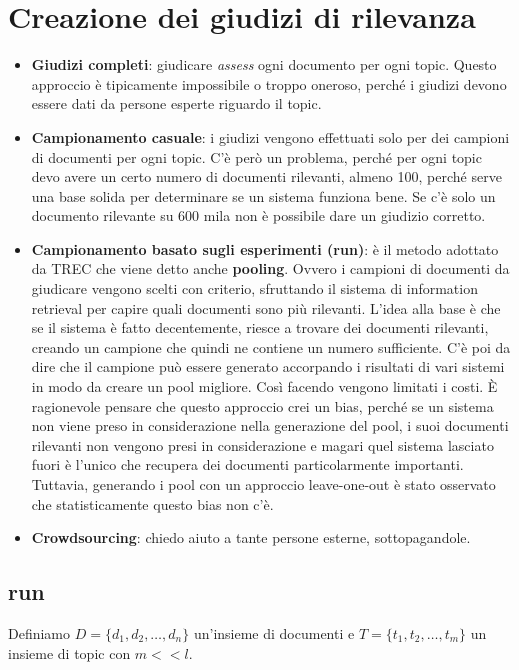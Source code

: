 \section{Creazione dei giudizi di rilevanza}

\begin{itemize}
	\item \textbf{Giudizi completi}: giudicare \textit{assess} ogni documento per ogni topic. Questo approccio è tipicamente impossibile o troppo oneroso, perché i giudizi devono essere dati da persone esperte riguardo il topic.
	\item \textbf{Campionamento casuale}: i giudizi vengono effettuati solo per dei campioni di documenti per ogni topic. C'è però un problema, perché per ogni topic devo avere un certo numero di documenti rilevanti, almeno 100, perché serve una base solida per determinare se un sistema funziona bene. Se c'è solo un documento rilevante su 600 mila non è possibile dare un giudizio corretto.
	\item \textbf{Campionamento basato sugli esperimenti (run)}: è il metodo adottato da TREC che viene detto anche \textbf{pooling}. Ovvero i campioni di documenti da giudicare vengono scelti con criterio, sfruttando il sistema di information retrieval per capire quali documenti sono più rilevanti.
	L'idea alla base è che se il sistema è fatto decentemente, riesce a trovare dei documenti rilevanti, creando un campione che quindi ne contiene un numero sufficiente.
	C'è poi da dire che il campione può essere generato accorpando i risultati di vari sistemi in modo da creare un pool migliore.
	Così facendo vengono limitati i costi.
	\`E ragionevole pensare che questo approccio crei un bias, perché se un sistema non viene preso in considerazione nella generazione del pool, i suoi documenti rilevanti non vengono presi in considerazione e magari quel sistema lasciato fuori è l'unico che recupera dei documenti particolarmente importanti.
	Tuttavia, generando i pool con un approccio leave-one-out è stato osservato che statisticamente questo bias non c'è.
	\item \textbf{Crowdsourcing}: chiedo aiuto a tante persone esterne, sottopagandole.
\end{itemize}

\subsection{run}

Definiamo $D = \{d_1, d_2, \ldots, d_n \}$ un'insieme di documenti e $T = \{ t_1, t_2, \ldots, t_m \}$ un insieme di topic con $m << l$.

